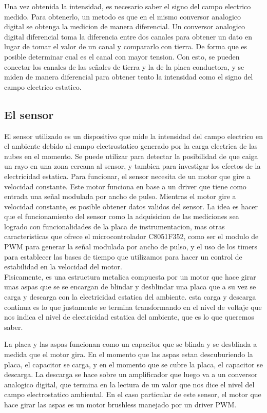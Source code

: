 Una vez obtenida la intensidad, es necesario saber el signo del campo electrico medido. Para obtenerlo, un metodo es que en el mismo conversor analogico digital se obtenga la medicion de manera diferencial. Un conversor analogico digital diferencial toma la diferencia entre dos canales para obtener un dato en lugar de tomar el valor de un canal y compararlo con tierra. De forma que es posible determinar cual es el canal con mayor tension. Con esto, se pueden conectar los canales de las señales de tierra y la de la placa conductora, y se miden de manera diferencial para obtener tento la intensidad como el signo del campo electrico estatico.
\cite{sensorcampo}

\subsection{El sensor} %
\label{it6:sub:el_sensor}

El sensor utilizado es un dispositivo que mide la intensidad del campo electrico en el ambiente debido al campo electrostatico generado por la carga electrica de las nubes en el momento. Se puede utilizar para detectar la posibilidad de que caiga un rayo en una zona cercana al sensor, y tambien para investigar los efectos de la electricidad estatica. Para funcionar, el sensor necesita de un motor que gire a velocidad constante. Este motor funciona en base a un driver que tiene como entrada una señal modulada por ancho de pulso.
Mientras el motor gire a velocidad constante, es posible obtener datos validos del sensor. La idea es hacer que el funcionamiento del sensor como la adquisicion de las mediciones sea logrado con funcionalidades de la placa de instrumentacion, mas otras caracteristicas que ofrece el microcontrolador C8051F352, como ser el modulo de PWM para generar la señal modulada por ancho de pulso, y el uso de los timers para establecer las bases de tiempo que utilizamos para hacer un control de estabilidad en la velocidad del motor. \\

Fisicamente, es una estructura metalica compuesta por un motor que hace girar unas aspas que se se encargan de blindar y desblindar una placa que a su vez se carga y descarga con la electricidad estatica del ambiente. esta carga y descarga continua es lo que justamente se termina transformando en el nivel de voltaje que nos indica el nivel de electricidad estatica del ambiente, que es lo que queremos saber.

La placa y las aspas funcionan como un capacitor que se blinda y se des\-blinda a medida que el motor gira. En el momento que las aspas estan descuburiendo la placa, el capacitor se carga, y en el momento que se cubre la placa, el capacitor se descarga. La descarga se hace sobre un amplificador que luego va a un conversor analogico digital, que termina en la lectura de un valor que nos dice el nivel del campo electrostatico ambiental. En el caso particular de este sensor, el motor que hace girar las aspas es un motor brushless manejado por un driver PWM.

